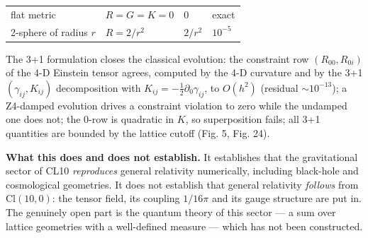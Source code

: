 \documentclass[aps,prd,amsmath,amssymb,superscriptaddress,longbibliography,floatfix,preprint]{revtex4-2}
\begin{document}
{\begin{longtable}{llll}
\arrayrulecolor{black!40}\hline\arrayrulecolor{black}
\parbox[c]{4.57cm}{\vspace{2.5pt}\raggedright {} flat metric\vspace{2.5pt}} & \parbox[c]{2.82cm}{\vspace{2.5pt}\raggedright {} \mbox{$R = G = K = 0$}\vspace{2.5pt}} & \parbox[c]{2.25cm}{\vspace{2.5pt}\raggedright {} \mbox{$0$}\vspace{2.5pt}} & \parbox[c]{5.01cm}{\vspace{2.5pt}\raggedright {} exact\vspace{2.5pt}} \\
\hline{}
\parbox[c]{4.57cm}{\vspace{2.5pt}\raggedright {} 2-sphere of radius \mbox{$r$}\vspace{2.5pt}} & \parbox[c]{2.82cm}{\vspace{2.5pt}\raggedright {} \mbox{$R = 2/r^2$}\vspace{2.5pt}} & \parbox[c]{2.25cm}{\vspace{2.5pt}\raggedright {} \mbox{$2/r^2$}\vspace{2.5pt}} & \parbox[c]{5.01cm}{\vspace{2.5pt}\raggedright {} \mbox{$10^{-5}$}\vspace{2.5pt}} \\
\end{longtable}
}

The 3+1 formulation closes the classical evolution: the constraint row $(R_{00},\allowbreak{} R_{0i})$ of the 4-D Einstein tensor agrees, computed by the 4-D curvature and by the 3+1 $(\gamma_{ij},\allowbreak{} K_{ij})$ decomposition with $K_{ij} = -\tfrac12\partial_0\gamma_{ij}$, to $O(h^2)$ (residual $\sim 10^{-13}$); a Z4-damped evolution \cite{ref34} drives a constraint violation to zero while the undamped one does not; the 0-row is quadratic in $K$, so superposition fails; all 3+1 quantities are bounded by the lattice cutoff (Fig. 5, Fig. 24).

\textbf{What this does and does not establish.} It establishes that the gravitational sector of CL10 \emph{reproduces} general relativity numerically, including black-hole and cosmological geometries. It does not establish that general relativity \emph{follows} from $\mathrm{Cl}(10,\allowbreak{}0)$: the tensor field, its coupling $1/16\pi$ and its gauge structure are put in. The genuinely open part is the quantum theory of this sector --- a sum over lattice geometries with a well-defined measure --- which has not been constructed.
\end{document}
